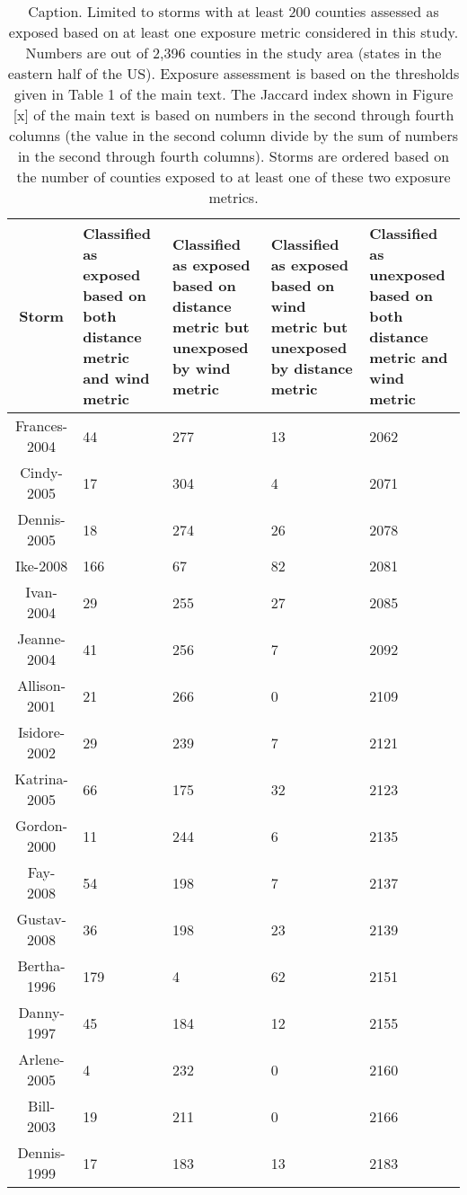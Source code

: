 \begin{table}[ht]
\centering
\caption{Caption. Limited to storms with at least 200 counties assessed as exposed based on at least one exposure metric considered in this study. Numbers are out of 2,396 counties in the study area (states in the eastern half of the US). Exposure assessment is based on the thresholds given in Table 1 of the main text. The Jaccard index shown in Figure [x] of the main text is based on numbers in the second through fourth columns (the value in the second column divide by the sum of numbers in the second through fourth columns). Storms are ordered based on the number of counties exposed to at least one of these two exposure metrics.} 
\begin{tabular}{cp{3cm}p{3cm}p{3cm}p{3cm}}
  \toprule
Storm & Classified as exposed based on both distance metric and wind metric & Classified as exposed based on distance metric but unexposed by wind metric & Classified as exposed based on wind metric but unexposed by distance metric & Classified as unexposed based on both distance metric and wind metric \\ 
  \midrule
Frances-2004 &  44 & 277 &  13 & 2062 \\ 
  Cindy-2005 &  17 & 304 &   4 & 2071 \\ 
  Dennis-2005 &  18 & 274 &  26 & 2078 \\ 
  Ike-2008 & 166 &  67 &  82 & 2081 \\ 
  Ivan-2004 &  29 & 255 &  27 & 2085 \\ 
  Jeanne-2004 &  41 & 256 &   7 & 2092 \\ 
  Allison-2001 &  21 & 266 &   0 & 2109 \\ 
  Isidore-2002 &  29 & 239 &   7 & 2121 \\ 
  Katrina-2005 &  66 & 175 &  32 & 2123 \\ 
  Gordon-2000 &  11 & 244 &   6 & 2135 \\ 
  Fay-2008 &  54 & 198 &   7 & 2137 \\ 
  Gustav-2008 &  36 & 198 &  23 & 2139 \\ 
  Bertha-1996 & 179 &   4 &  62 & 2151 \\ 
  Danny-1997 &  45 & 184 &  12 & 2155 \\ 
  Arlene-2005 &   4 & 232 &   0 & 2160 \\ 
  Bill-2003 &  19 & 211 &   0 & 2166 \\ 
  Dennis-1999 &  17 & 183 &  13 & 2183 \\ 

\end{tabular}
\end{table}
